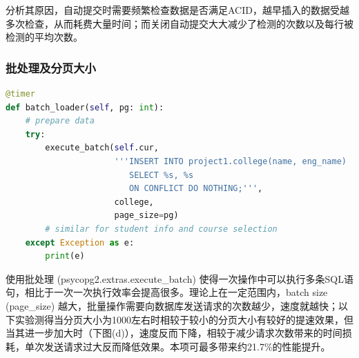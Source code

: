 \par 分析其原因，自动提交时需要频繁检查数据是否满足ACID，越早插入的数据受越多次检查，从而耗费大量时间；而关闭自动提交大大减少了检测的次数以及每行被检测的平均次数。

\subsubsection{批处理及分页大小}
\begin{lstlisting}[language=python]
@timer
def batch_loader(self, pg: int):
    # prepare data
    try:
        execute_batch(self.cur,
                      '''INSERT INTO project1.college(name, eng_name)
                         SELECT %s, %s
                         ON CONFLICT DO NOTHING;''',
                      college,
                      page_size=pg)
        # similar for student info and course selection
    except Exception as e:
        print(e)
\end{lstlisting}
\vspace{-3em}\par
使用批处理 (psycopg2.extras.execute\_batch) 使得一次操作中可以执行多条SQL语句，相比于一次一次执行效率会提高很多。理论上在一定范围内，batch size (page\_size) 越大，批量操作需要向数据库发送请求的次数越少，速度就越快；以下实验测得当分页大小为1000左右时相较于较小的分页大小有较好的提速效果，但当其进一步加大时（下图(d)），速度反而下降，相较于减少请求次数带来的时间损耗，单次发送请求过大反而降低效果。本项可最多带来约21.7\%的性能提升。
~\\
